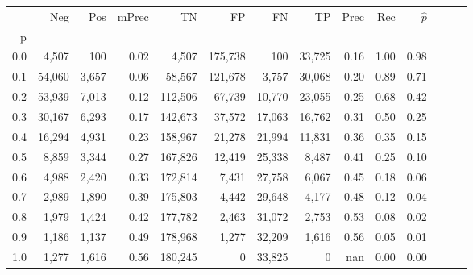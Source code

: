 \begin{tabular}{rrrrrrrrrrrrrr}
\toprule
{} &     Neg &    Pos & mPrec &       TN &       FP &      FN &      TP &  Prec &   Rec & $\hat{p}$ \\
p   &         &        &       &          &          &         &         &       &       &           \\
\midrule
0.0 &   4,507 &    100 &  0.02 &    4,507 &  175,738 &     100 &  33,725 &  0.16 &  1.00 &      0.98 \\
0.1 &  54,060 &  3,657 &  0.06 &   58,567 &  121,678 &   3,757 &  30,068 &  0.20 &  0.89 &      0.71 \\
0.2 &  53,939 &  7,013 &  0.12 &  112,506 &   67,739 &  10,770 &  23,055 &  0.25 &  0.68 &      0.42 \\
0.3 &  30,167 &  6,293 &  0.17 &  142,673 &   37,572 &  17,063 &  16,762 &  0.31 &  0.50 &      0.25 \\
0.4 &  16,294 &  4,931 &  0.23 &  158,967 &   21,278 &  21,994 &  11,831 &  0.36 &  0.35 &      0.15 \\
0.5 &   8,859 &  3,344 &  0.27 &  167,826 &   12,419 &  25,338 &   8,487 &  0.41 &  0.25 &      0.10 \\
0.6 &   4,988 &  2,420 &  0.33 &  172,814 &    7,431 &  27,758 &   6,067 &  0.45 &  0.18 &      0.06 \\
0.7 &   2,989 &  1,890 &  0.39 &  175,803 &    4,442 &  29,648 &   4,177 &  0.48 &  0.12 &      0.04 \\
0.8 &   1,979 &  1,424 &  0.42 &  177,782 &    2,463 &  31,072 &   2,753 &  0.53 &  0.08 &      0.02 \\
0.9 &   1,186 &  1,137 &  0.49 &  178,968 &    1,277 &  32,209 &   1,616 &  0.56 &  0.05 &      0.01 \\
1.0 &   1,277 &  1,616 &  0.56 &  180,245 &        0 &  33,825 &       0 &   nan &  0.00 &      0.00 \\
\bottomrule
\end{tabular}
